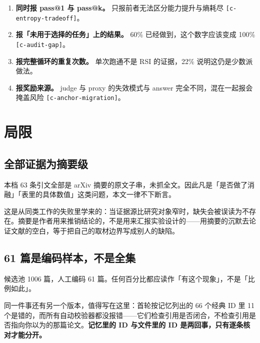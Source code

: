 \begin{enumerate}
  \item \textbf{同时报 pass@1 与 pass@k。} 只报前者无法区分能力提升与熵耗尽 {\scriptsize\texttt{[c-\hspace{0pt}entropy-\hspace{0pt}tradeoff]}}。
  \item \textbf{报「未用于选择的任务」上的结果。} 60\% 已经做到，这个数字应该变成 100\% {\scriptsize\texttt{[c-\hspace{0pt}audit-\hspace{0pt}gap]}}。
  \item \textbf{报完整循环的重复次数。} 单次跑通不是 RSI 的证据，22\% 说明这仍是少数派做法。
  \item \textbf{报奖励来源。} judge 与 proxy 的失效模式与 answer 完全不同，混在一起报会掩盖风险 {\scriptsize\texttt{[c-\hspace{0pt}anchor-\hspace{0pt}migration]}}。
\end{enumerate}

\section{局限}

\subsection{全部证据为摘要级}

本档 63 条引文全部是 arXiv 摘要的原文子串，未抓全文。因此凡是「是否做了消融」「表里的具体数值」这类问题，本文一律不下断言。


这是从同类工作的失败里学来的：当证据源比研究对象窄时，缺失会被误读为不存在。摘要是作者用来推销结论的，不是用来汇报实验设计的——用摘要的沉默去论证文献的空白，等于把自己的取材边界写成别人的缺陷。


\subsection{61 篇是编码样本，不是全集}

候选池 1006 篇，人工编码 61 篇。任何百分比都应读作「有这个现象」，不是「比例如此」。


同一件事还有另一个版本，值得写在这里：首轮按记忆列出的 66 个经典 ID 里 11 个是错的，而所有自动校验器都没报错——它们检查引用是否闭合，不检查引用是否指向你以为的那篇论文。\textbf{记忆里的 ID 与文件里的 ID 是两回事，只有逐条核对才能分开。}


